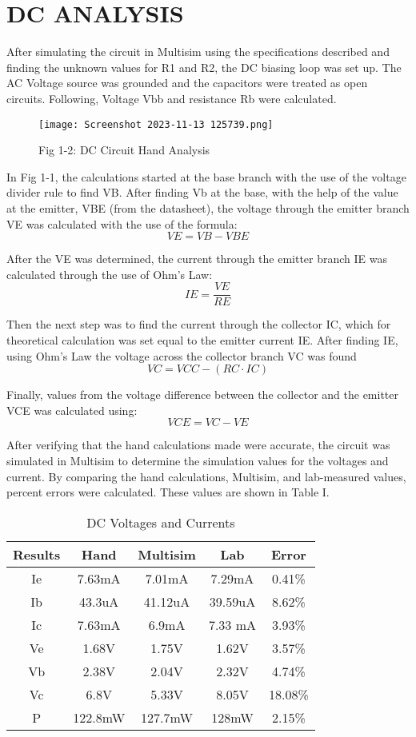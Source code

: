 \documentclass[conference]{IEEEtran}
\begin{document}
\section{DC ANALYSIS}
After simulating the circuit in Multisim using the specifications described and finding the unknown values for R1 and R2, the DC biasing loop was set up. The AC Voltage source was grounded and the capacitors were treated as open circuits. Following, Voltage Vbb and resistance Rb were calculated. 

\begin{figure}[htbp]
    \centering
    \texttt{[image: Screenshot 2023-11-13 125739.png]}
    \caption{Fig 1-2: DC Circuit Hand Analysis}
    \label{fig1-1:dc-circuit-hand-analysis}
\end{figure}

In Fig 1-1, the calculations started at the base branch with the use of
the voltage divider rule to find VB. After finding Vb
at the base, with the help of the value at the emitter, VBE
(from the datasheet), the voltage through the emitter branch
VE was calculated with the use of the formula:
\[VE = VB - VBE\]

After the VE was determined, the current through the emitter
branch IE was calculated through the use of Ohm's Law:
\[IE = \frac{VE}{RE}\]

Then the next step was to find the current through the
collector IC, which for theoretical calculation was set equal to the emitter current IE.  After finding IE, using Ohm's Law the voltage across the collector branch VC was found
\[VC = VCC - (RC \cdot IC)\]

Finally, values from the voltage difference between the collector and the emitter VCE was calculated using:
\[ VCE = VC-VE\]

After verifying that the hand calculations made were accurate, the circuit was simulated in Multisim to determine the simulation values for the voltages and current. By comparing the hand calculations, Multisim, and lab-measured values,
percent errors were calculated. 
These values are shown in Table I.

\begin{table}[htbp]
\centering
\begin{tabular}{|c|c|c|c|c|}
\hline
Results & Hand & Multisim & Lab & Error \\ \hline
Ie & 7.63mA & 7.01mA & 7.29mA& 0.41\%  \\ \hline
Ib & 43.3uA& 41.12uA & 39.59uA& 8.62\%\\ \hline
Ic & 7.63mA & 6.9mA & 7.33 mA& 3.93\%\\ \hline
Ve & 1.68V & 1.75V& 1.62V& 3.57\%\\ \hline
Vb & 2.38V & 2.04V & 2.32V& 4.74\%\\ \hline
Vc& 6.8V& 5.33V& 8.05V& 18.08\%\\ \hline
P & 122.8mW&   127.7mW& 128mW& 2.15\%\\ \hline
\end{tabular}
\caption{DC Voltages and Currents}
\label{tab:DC-Voltage-and-Currents}
\end{table}
\end{document}
